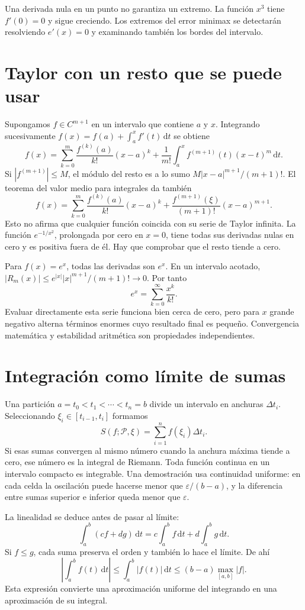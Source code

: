 \documentclass[11pt,a4paper]{article}
\newcommand{\dd}{\,\mathrm d}
\theoremstyle{definition}
\newcommand{\eps}{\varepsilon}
\begin{document}
Una derivada nula en un punto no garantiza un extremo. La función $x^3$ tiene $f'(0)=0$ y sigue creciendo. Los extremos del error minimax se detectarán resolviendo $e'(x)=0$ y examinando también los bordes del intervalo.

\section{Taylor con un resto que se puede usar}
Supongamos $f\in C^{m+1}$ en un intervalo que contiene $a$ y $x$. Integrando sucesivamente $f(x)=f(a)+\int_a^x f'(t)\dd t$ se obtiene
\[
f(x)=\sum_{k=0}^m\frac{f^{(k)}(a)}{k!}(x-a)^k+
\frac1{m!}\int_a^x f^{(m+1)}(t)(x-t)^m\dd t.
\]
Si $|f^{(m+1)}|\le M$, el módulo del resto es a lo sumo $M|x-a|^{m+1}/(m+1)!$. El teorema del valor medio para integrales da también
\[
f(x)=\sum_{k=0}^m\frac{f^{(k)}(a)}{k!}(x-a)^k+
\frac{f^{(m+1)}(\xi)}{(m+1)!}(x-a)^{m+1}.
\]
Esto no afirma que cualquier función coincida con su serie de Taylor infinita. La función $e^{-1/x^2}$, prolongada por cero en $x=0$, tiene todas sus derivadas nulas en cero y es positiva fuera de él. Hay que comprobar que el resto tiende a cero.

Para $f(x)=e^x$, todas las derivadas son $e^x$. En un intervalo acotado, $|R_m(x)|\le e^{|x|}|x|^{m+1}/(m+1)!\to0$. Por tanto
\[
e^x=\sum_{k=0}^\infty\frac{x^k}{k!}.
\]
Evaluar directamente esta serie funciona bien cerca de cero, pero para $x$ grande negativo alterna términos enormes cuyo resultado final es pequeño. Convergencia matemática y estabilidad aritmética son propiedades independientes.

\section{Integración como límite de sumas}
Una partición $a=t_0<t_1<\cdots<t_n=b$ divide un intervalo en anchuras $\Delta t_i$. Seleccionando $\xi_i\in[t_{i-1},t_i]$ formamos
\[
S(f;\mathcal P,\xi)=\sum_{i=1}^n f(\xi_i)\Delta t_i.
\]
Si esas sumas convergen al mismo número cuando la anchura máxima tiende a cero, ese número es la integral de Riemann. Toda función continua en un intervalo compacto es integrable. Una demostración usa continuidad uniforme: en cada celda la oscilación puede hacerse menor que $\eps/(b-a)$, y la diferencia entre sumas superior e inferior queda menor que $\eps$.

La linealidad se deduce antes de pasar al límite:
\[
\int_a^b(cf+dg)\dd t=c\int_a^b f\dd t+d\int_a^b g\dd t.
\]
Si $f\le g$, cada suma preserva el orden y también lo hace el límite. De ahí
\[
\left|\int_a^b f(t)\dd t\right|\le\int_a^b|f(t)|\dd t
\le(b-a)\max_{[a,b]}|f|.
\]
Esta expresión convierte una aproximación uniforme del integrando en una aproximación de su integral.
\end{document}
